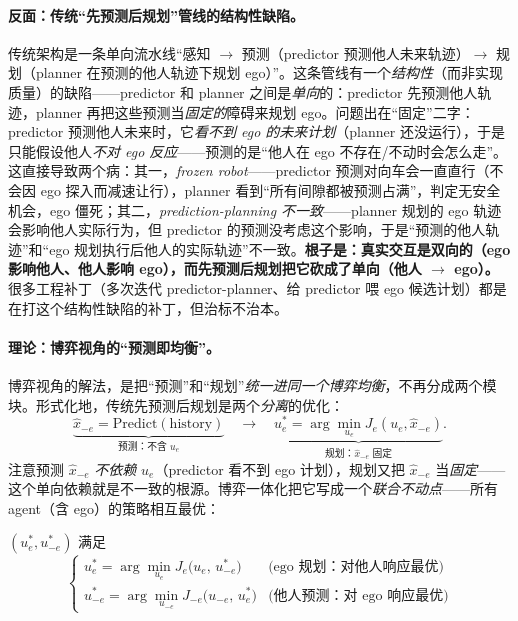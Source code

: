 \paragraph{反面：传统“先预测后规划”管线的结构性缺陷。}
传统架构是一条单向流水线“感知 $\to$ 预测（predictor 预测他人未来轨迹）$\to$ 规划（planner 在预测的他人轨迹下规划 ego）”。这条管线有一个\emph{结构性}（而非实现质量）的缺陷——predictor 和 planner 之间是\emph{单向}的：predictor 先预测他人轨迹，planner 再把这些预测当\emph{固定的}障碍来规划 ego。问题出在“固定”二字：predictor 预测他人未来时，它\emph{看不到 ego 的未来计划}（planner 还没运行），于是只能假设他人\emph{不对 ego 反应}——预测的是“他人在 ego 不存在/不动时会怎么走”。这直接导致两个病：其一，\emph{frozen robot}——predictor 预测对向车会一直直行（不会因 ego 探入而减速让行），planner 看到“所有间隙都被预测占满”，判定无安全机会，ego 僵死；其二，\emph{prediction-planning 不一致}——planner 规划的 ego 轨迹会影响他人实际行为，但 predictor 的预测没考虑这个影响，于是“预测的他人轨迹”和“ego 规划执行后他人的实际轨迹”不一致。\textbf{根子是：真实交互是双向的（ego 影响他人、他人影响 ego），而先预测后规划把它砍成了单向（他人 $\to$ ego）。}很多工程补丁（多次迭代 predictor-planner、给 predictor 喂 ego 候选计划）都是在打这个结构性缺陷的补丁，但治标不治本。

\paragraph{理论：博弈视角的“预测即均衡”。}
博弈视角的解法，是把“预测”和“规划”\emph{统一进同一个博弈均衡}，不再分成两个模块。形式化地，传统先预测后规划是两个\emph{分离}的优化：
\begin{equation}
  \underbrace{\hat x_{-e}=\mathrm{Predict}(\text{history})}_{\text{预测：不含 }u_e}\quad\to\quad
  \underbrace{u_e^*=\arg\min_{u_e}J_e(u_e,\hat x_{-e})}_{\text{规划：}\hat x_{-e}\text{ 固定}}.
  \label{eq:rtg-pred-then-plan}
\end{equation}
注意预测 $\hat x_{-e}$ \emph{不依赖} $u_e$（predictor 看不到 ego 计划），规划又把 $\hat x_{-e}$ 当\emph{固定}——这个单向依赖就是不一致的根源。博弈一体化把它写成一个\emph{联合不动点}——所有 agent（含 ego）的策略相互最优：

\begin{definition}[预测即均衡的联合不动点]\label{def:rtg-pred-eq}
$(u_e^*,u_{-e}^*)$ 满足
\begin{equation}
  \begin{cases}
    u_e^*=\arg\min_{u_e}J_e\big(u_e,\,u_{-e}^*\big) & \text{(ego 规划：对他人响应最优)}\\[4pt]
    u_{-e}^*=\arg\min_{u_{-e}}J_{-e}\big(u_{-e},\,u_e^*\big) & \text{(他人预测：对 ego 响应最优)}
  \end{cases}
  \label{eq:rtg-joint-fixedpoint}
\end{equation}
\end{definition}

